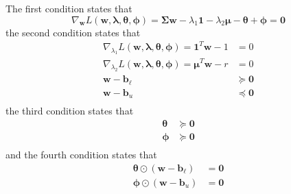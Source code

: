 \documentclass{beamer}
\begin{document}
\begin{frame}

\justifying
The first condition states that
\justifying
\begin{equation*}
	\nabla_{\mathbf{w}} L\left(\mathbf{w},\boldsymbol\lambda,\boldsymbol\theta,\boldsymbol\phi\right) = \mathbf{\Sigma}\mathbf{w} - \lambda_{1} \mathbf{1} - \lambda_{2} \boldsymbol\mu - \boldsymbol\theta + \boldsymbol\phi = \mathbf{0}
\end{equation*}
\justifying
the second condition states that
\justifying
\begin{equation*}
\begin{aligned}
	\nabla_{\lambda_{1}} L\left(\mathbf{w},\boldsymbol\lambda,\boldsymbol\theta,\boldsymbol\phi\right) = \mathbf{1}^{T}\mathbf{w} - 1 & = 0\\
	\nabla_{\lambda_{2}} L\left(\mathbf{w},\boldsymbol\lambda,\boldsymbol\theta,\boldsymbol\phi\right) = \boldsymbol\mu^{T}\mathbf{w} - r & = 0\\
	\mathbf{w} - \mathbf{b}_{\ell} & \succcurlyeq \mathbf{0}\\
	\mathbf{w} - \mathbf{b}_{u} & \preccurlyeq \mathbf{0}\\
\end{aligned}
\end{equation*}
\justifying
the third condition states that
\justifying
\begin{equation*}
\begin{aligned}
	\boldsymbol\theta & \succcurlyeq \mathbf{0} \\
	\boldsymbol\phi & \succcurlyeq \mathbf{0}\\
\end{aligned}
\end{equation*}
\justifying
and the fourth condition states that
\justifying
\begin{equation*}
\begin{aligned}
	\boldsymbol\theta \odot \left( \mathbf{w}-\mathbf{b}_{\ell} \right) & = \mathbf{0} \\
	\boldsymbol\phi \odot \left( \mathbf{w}-\mathbf{b}_{u} \right) & = \mathbf{0} \\
\end{aligned}
\end{equation*}

\end{frame}
\end{document}
